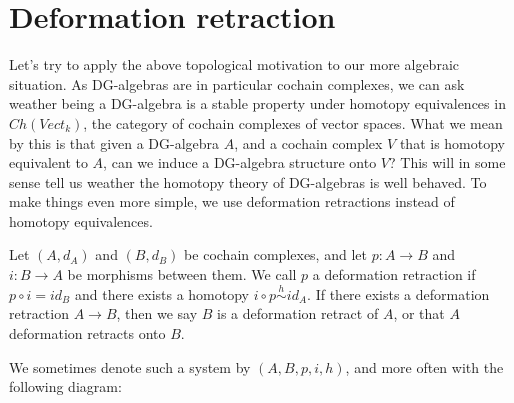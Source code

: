 

\section{Deformation retraction}
\label{sec:deformation_retraction}



Let's try to apply the above topological motivation to our more algebraic situation. As DG-algebras are in particular cochain complexes, we can ask weather being a DG-algebra is a stable property under homotopy equivalences in $Ch(Vect_k)$, the category of cochain complexes of vector spaces. What we mean by this is that given a DG-algebra $A$, and a cochain complex $V$ that is homotopy equivalent to $A$, can we induce a DG-algebra structure onto $V$? This will in some sense tell us weather the homotopy theory of DG-algebras is well behaved. To make things even more simple, we use deformation retractions instead of homotopy equivalences. 

\begin{definition}
\label{def:deformation_retraction}
Let $(A, d_A)$ and $(B, d_B)$ be cochain complexes, and let $p:A\longrightarrow B$ and $i:B\longrightarrow A$ be morphisms between them. We call $p$ a deformation retraction if $p\circ i = id_B$ and there exists a homotopy $i\circ p\overset{h}\sim id_A$. If there exists a deformation retraction $A\longrightarrow B$, then we say $B$ is a deformation retract of $A$, or that $A$ deformation retracts onto $B$.

We sometimes denote such a system by $(A, B, p, i, h)$, and more often with the following diagram:
\begin{center}
\end{center}
\end{definition}

